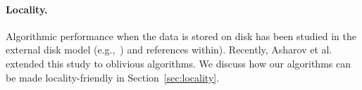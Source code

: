 \paragraph{Locality.} Algorithmic performance when the data is stored on disk has been studied in the external disk model (e.g.,~\cite{RuemmlerW94,ArgeFGV97,Vitter01,Vitter06}) and references within). Recently, Asharov et al.~\cite{AsharovCNPRS19} extended this study to oblivious algorithms.  We discuss how our algorithms can be made locality-friendly in Section~\ref{sec:locality}. 



%
%
%
%
%

